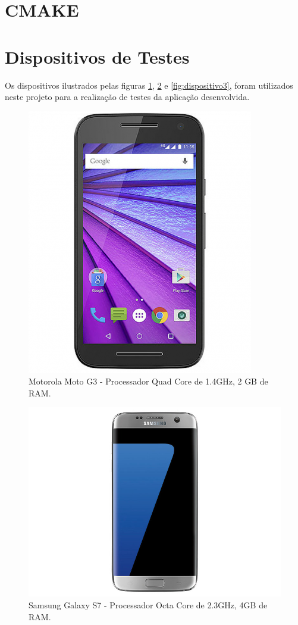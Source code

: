 \section{CMAKE}\label{sec:cmake}

\section{Dispositivos de Testes}\label{sec:dispositivos}

Os dispositivos ilustrados pelas figuras \ref{fig:dispositivo1}, \ref{fig:dispositivo2} e \ref{fig:dispositivo3}, foram utilizados neste projeto para a realização de testes da aplicação desenvolvida.

	\begin{figure}[!htb]
       \begin{center}  
          \includegraphics[width=0.3\columnwidth]{img/dispositivo1.jpg}
           \caption{\label{fig:dispositivo1}Motorola Moto G3 - Processador Quad Core de 1.4GHz, 2 GB de RAM.}
       \end{center}
   \end{figure}
   
	\begin{figure}[!htb]
       \begin{center}  
          \includegraphics[width=0.5\columnwidth]{img/dispositivo2.jpg}
           \caption{\label{fig:dispositivo2}Samsung Galaxy S7 - Processador Octa Core de 2.3GHz, 4GB de RAM.}
       \end{center}
   \end{figure}
   
